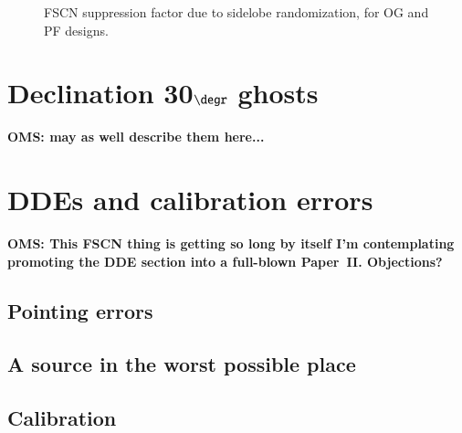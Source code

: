 \documentclass{aa}
\begin{document}
\begin{figure}
\caption{\label{fig:fscn-rr-suppression}FSCN suppression factor due to sidelobe randomization, for OG and PF designs.}
\end{figure}

\section{Declination 30$\degr$ ghosts}

{\bf OMS: may as well describe them here...}

\section{DDEs and calibration errors}
\label{sec:dde}

{\bf OMS: This FSCN thing is getting so long by itself I'm contemplating promoting the DDE section into a full-blown Paper~II. Objections?}

\subsection{Pointing errors}

\subsection{A source in the worst possible place}

\subsection{Calibration}
\end{document}

